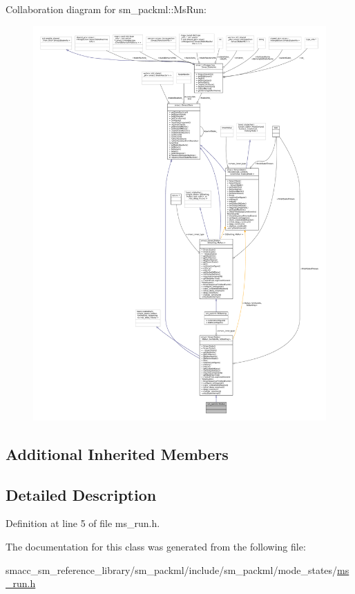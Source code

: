 Collaboration diagram for sm\+\_\+packml\+:\+:Ms\+Run\+:
\nopagebreak
\begin{figure}[H]
\begin{center}
\leavevmode
\includegraphics[width=350pt]{classsm__packml_1_1MsRun__coll__graph}
\end{center}
\end{figure}
\subsection*{Additional Inherited Members}


\subsection{Detailed Description}


Definition at line 5 of file ms\+\_\+run.\+h.



The documentation for this class was generated from the following file\+:\begin{DoxyCompactItemize}
\item 
smacc\+\_\+sm\+\_\+reference\+\_\+library/sm\+\_\+packml/include/sm\+\_\+packml/mode\+\_\+states/\hyperlink{sm__packml_2include_2sm__packml_2mode__states_2ms__run_8h}{ms\+\_\+run.\+h}\end{DoxyCompactItemize}
